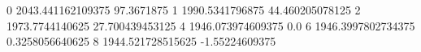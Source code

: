 0 2043.441162109375 97.3671875
1 1990.5341796875 44.460205078125
2 1973.7744140625 27.700439453125
4 1946.073974609375 0.0
6 1946.3997802734375 0.3258056640625
8 1944.521728515625 -1.55224609375
